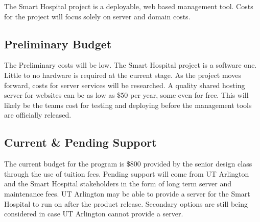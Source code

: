 The Smart Hospital project is a deployable, web based management tool. Costs for the project will focus solely on server and domain costs.

\subsection{Preliminary Budget}
The Preliminary costs will be low. The Smart Hospital project is a software one. Little to no hardware is required at the current stage. As the project moves forward, costs for server services will be researched. A quality shared hosting server for websites can be as low as \$50 per year, some even for free. This will likely be the teams cost for testing and deploying before the management tools are officially released. 

\subsection{Current \& Pending Support}
The current budget for the program is \$800 provided by the senior design class through the use of tuition fees. Pending support will come from UT Arlington and the Smart Hospital stakeholders in the form of long term server and maintenance fees. UT Arlington may be able to provide a server for the Smart Hospital to run on after the product release. Secondary options are still being considered in case UT Arlington cannot provide a server.